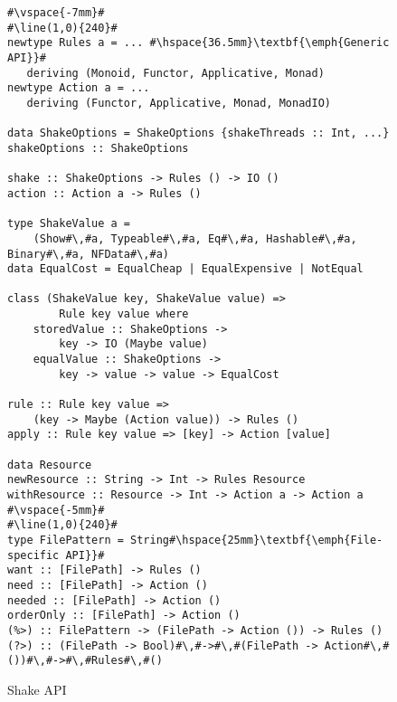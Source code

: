\begin{figure}
\begin{lstlisting}
#\vspace{-7mm}#
#\line(1,0){240}#
newtype Rules a = ... #\hspace{36.5mm}\textbf{\emph{Generic API}}#
   deriving (Monoid, Functor, Applicative, Monad)
newtype Action a = ...
   deriving (Functor, Applicative, Monad, MonadIO)

data ShakeOptions = ShakeOptions {shakeThreads :: Int, ...}
shakeOptions :: ShakeOptions

shake :: ShakeOptions -> Rules () -> IO ()
action :: Action a -> Rules ()

type ShakeValue a =
    (Show#\,#a, Typeable#\,#a, Eq#\,#a, Hashable#\,#a, Binary#\,#a, NFData#\,#a)
data EqualCost = EqualCheap | EqualExpensive | NotEqual

class (ShakeValue key, ShakeValue value) =>
        Rule key value where
    storedValue :: ShakeOptions ->
        key -> IO (Maybe value)
    equalValue :: ShakeOptions ->
        key -> value -> value -> EqualCost

rule :: Rule key value =>
    (key -> Maybe (Action value)) -> Rules ()
apply :: Rule key value => [key] -> Action [value]

data Resource
newResource :: String -> Int -> Rules Resource
withResource :: Resource -> Int -> Action a -> Action a
#\vspace{-5mm}#
#\line(1,0){240}#
type FilePattern = String#\hspace{25mm}\textbf{\emph{File-specific API}}#
want :: [FilePath] -> Rules ()
need :: [FilePath] -> Action ()
needed :: [FilePath] -> Action ()
orderOnly :: [FilePath] -> Action ()
(%>) :: FilePattern -> (FilePath -> Action ()) -> Rules ()
(?>) :: (FilePath -> Bool)#\,#->#\,#(FilePath -> Action#\,#())#\,#->#\,#Rules#\,#()
\end{lstlisting}

\caption{Shake API\label{fig:shake-api}}
\end{figure}

% 

